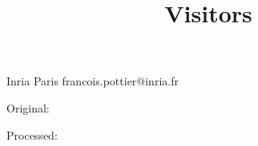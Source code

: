 \documentclass[onecolumn,11pt,nocopyrightspace]{sigplanconf}
\title{Visitors}
\begin{document}
	   {Inria Paris}
	   {francois.pottier@inria.fr}

\maketitle


\clearpage
\tableofcontents
\clearpage


Original:

Processed:

\end{document}
